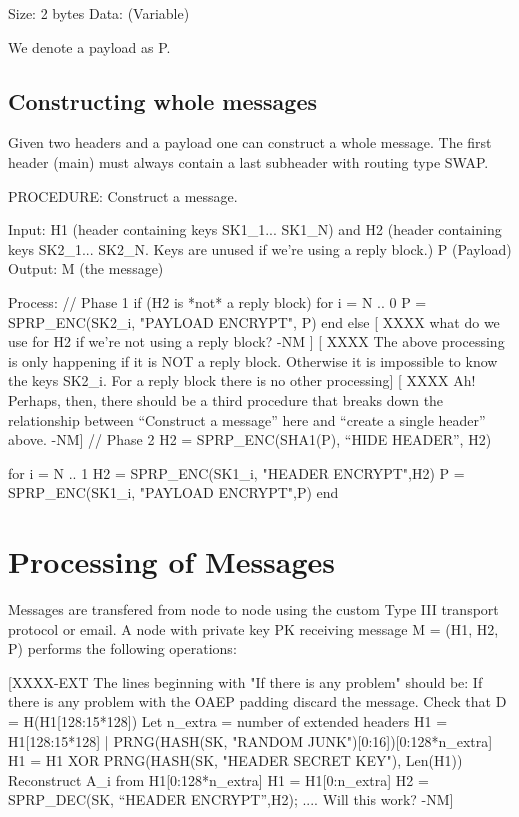 Size:   2 bytes
Data:   (Variable)

We denote a payload as P.

\subsection{Constructing whole messages}

Given two headers and a payload one can construct a whole
message. The first header (main) must always contain a last subheader
with routing type SWAP.  

PROCEDURE: Construct a message.

Input: H1 (header containing keys SK1_1... SK1_N)
       and H2 (header containing keys SK2_1... SK2_N.  Keys are unused
            if we're using a reply block.)
       P (Payload)
Output: M (the message)

Process:
	// Phase 1
	if (H2 is *not* a reply block)
		for i = N .. 0
	            P = SPRP_ENC(SK2_i, "PAYLOAD ENCRYPT", P)
		end
        else
           [ XXXX what do we use for H2 if we're not using a reply
	           block? -NM ]
	   [ XXXX The above processing is only happening if it is NOT
	a reply block. Otherwise it is impossible to know the keys
	SK2_i. For a reply block there is no other processing]
           [ XXXX Ah!  Perhaps, then, there should be a third
	          procedure that breaks down the relationship between
                  ``Construct a message'' here and ``create a single header''
                  above. -NM]
	// Phase 2
	H2 = SPRP_ENC(SHA1(P), ``HIDE HEADER'', H2)

	for i = N .. 1
		H2 = SPRP_ENC(SK1_i, "HEADER ENCRYPT",H2)
		P = SPRP_ENC(SK1_i, "PAYLOAD ENCRYPT",P)
	end

\section{Processing of Messages}

Messages are transfered from node to node using the custom Type III
transport protocol or email.  A node with private key PK receiving
message M = (H1, H2, P) performs the following operations:

[XXXX-EXT The lines beginning with "If there is any problem" should
     be:
        If there is any problem with the OAEP padding discard the message.
        Check that D = H(H1[128:15*128])
        Let n_extra = number of extended headers
        H1 = H1[128:15*128] | PRNG(HASH(SK, "RANDOM 
                                               JUNK")[0:16])[0:128*n_extra]
	H1 = H1 XOR PRNG(HASH(SK, "HEADER SECRET KEY"), Len(H1))
        Reconstruct A_i from H1[0:128*n_extra]
        H1 = H1[0:n_extra]
	H2 = SPRP_DEC(SK, ``HEADER ENCRYPT'',H2);
        ....
        Will this work? -NM]

